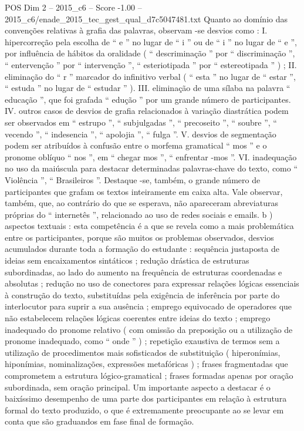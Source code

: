 \begin{textsample}{POS Dim 2 – 2015\_c6 – Score -1.00 – 2015\_c6/enade\_2015\_tec\_gest\_qual\_d7c5047481.txt}
Quanto ao domínio das convenções relativas à grafia das palavras, observam -se desvios como : I. hipercorreção pela escolha de “ e ” no lugar de “ i ” ou de “ i ” no lugar de “ e ”, por influência de hábitos da oralidade ( “ descriminação ” por “ discriminação ”, “ entervenção ” por “ intervenção ”, “ esteriotipada ” por “ estereotipada ” ) ; II. eliminação do “ r ” marcador do infinitivo verbal ( “ esta ” no lugar de “ estar ”, “ estuda ” no lugar de “ estudar ” ).
III. eliminação de uma sílaba na palavra “ educação ”, que foi grafada “ edução ” por um grande número de participantes.
IV. outros casos de desvios de grafia relacionados à variação diastrática podem ser observados em “ estrupo ”, “ subjulgadas ”, “ precoseito ”, “ soubre ”, “ vecendo ”, “ indesencia ”, “ apolojia ”, “ fulga ”.
V. desvios de segmentação podem ser atribuídos à confusão entre o morfema gramatical “ mos ” e o pronome oblíquo “ nos ”, em “ chegar mos ”, “ enfrentar -mos ”.
VI. inadequação no uso da maiúscula para destacar determinadas palavras-chave do texto, como “ Violência ”, “ Brasileiros ”.
Destaque -se, também, o grande número de participantes que grafam os textos inteiramente em caixa alta.
Vale observar, também, que, ao contrário do que se esperava, não apareceram abreviaturas próprias do “ internetês ”, relacionado ao uso de redes sociais e emails. b ) aspectos textuais : esta competência é a que se revela como a mais problemática entre os participantes, porque são muitos os problemas observados, desvios acumulados durante toda a formação do estudante : sequência justaposta de ideias sem encaixamentos sintáticos ; redução drástica de estruturas subordinadas, ao lado do aumento na frequência de estruturas coordenadas e absolutas ; redução no uso de conectores para expressar relações lógicas essenciais à construção do texto, substituídas pela exigência de inferência por parte do interlocutor para suprir a sua ausência ; emprego equivocado de operadores que não estabelecem relações lógicas coerentes entre ideias do texto ; emprego inadequado do pronome relativo ( com omissão da preposição ou a utilização de pronome inadequado, como “ onde ” ) ; repetição exaustiva de termos sem a utilização de procedimentos mais sofisticados de substituição ( hiperonímias, hiponímias, nominalizações, expressões metafóricas ) ; frases fragmentadas que comprometem a estrutura lógico-gramatical ; frases formadas apenas por oração subordinada, sem oração principal.
Um importante aspecto a destacar é o baixíssimo desempenho de uma parte dos participantes em relação à estrutura formal do texto produzido, o que é extremamente preocupante ao se levar em conta que são graduandos em fase final de formação.

\end{textsample}
